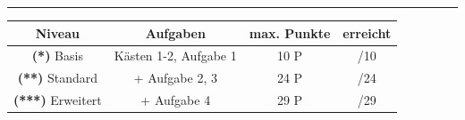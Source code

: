 \documentclass[11pt,a4paper]{article}
\newcommand{\stern}[1]{\textbf{(#1)}}
\begin{document}
\vspace{1.5em}

\hrule
\vspace{0.5em}

\begin{center}
\begin{tabular}{|c|c|c|c|}
\hline
\textbf{Niveau} & \textbf{Aufgaben} & \textbf{max. Punkte} & \textbf{erreicht} \\
\hline
\stern{*} Basis & Kästen 1-2, Aufgabe 1 & 10 P & \hspace{1.5cm}/10 \\
\hline
\stern{**} Standard & + Aufgabe 2, 3 & 24 P & \hspace{1.5cm}/24 \\
\hline
\stern{***} Erweitert & + Aufgabe 4 & 29 P & \hspace{1.5cm}/29 \\
\hline
\end{tabular}
\end{center}
\end{document}

